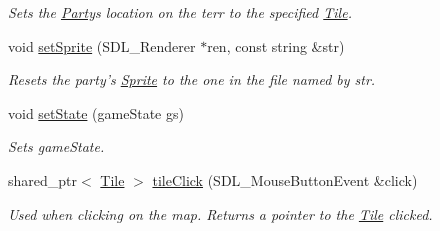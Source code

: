 \begin{DoxyCompactItemize}
\begin{DoxyCompactList}\small\item\em Sets the \hyperlink{class_party}{Party}\textquotesingle{}s location on the terr to the specified \hyperlink{class_tile}{Tile}. \end{DoxyCompactList}\item 
void \hyperlink{class_party_abe069ffbbf3352f6b39246c8382dd26b}{set\+Sprite} (S\+D\+L\+\_\+\+Renderer $\ast$ren, const string \&str)\hypertarget{class_party_abe069ffbbf3352f6b39246c8382dd26b}{}\label{class_party_abe069ffbbf3352f6b39246c8382dd26b}

\begin{DoxyCompactList}\small\item\em Resets the party’s \hyperlink{class_sprite}{Sprite} to the one in the file named by str. \end{DoxyCompactList}\item 
void \hyperlink{class_party_a7cc812d17ccb47a6109e60a5d0b82ded}{set\+State} (game\+State gs)\hypertarget{class_party_a7cc812d17ccb47a6109e60a5d0b82ded}{}\label{class_party_a7cc812d17ccb47a6109e60a5d0b82ded}

\begin{DoxyCompactList}\small\item\em Sets game\+State. \end{DoxyCompactList}\item 
shared\+\_\+ptr$<$ \hyperlink{class_tile}{Tile} $>$ \hyperlink{class_party_af38511e79b486f468c4f3d8e7be0cd1a}{tile\+Click} (S\+D\+L\+\_\+\+Mouse\+Button\+Event \&click)\hypertarget{class_party_af38511e79b486f468c4f3d8e7be0cd1a}{}\label{class_party_af38511e79b486f468c4f3d8e7be0cd1a}

\begin{DoxyCompactList}\small\item\em Used when clicking on the map. Returns a pointer to the \hyperlink{class_tile}{Tile} clicked. \end{DoxyCompactList}\end{DoxyCompactItemize}
